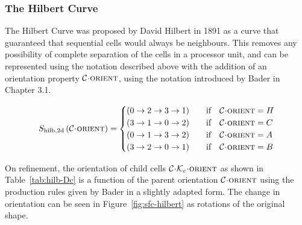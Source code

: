 \documentclass[twoside]{IIBproject}
\newcommand{\acc}{{\mkern 0.5mu\cdot\mkern 0.5mu}}
\numberwithin{figure}{section}
\begin{document}

        \subsubsection{The Hilbert Curve}
            \label{sec:tftt-hilb}

            The Hilbert Curve was proposed by David Hilbert in 1891 as a curve that guaranteed that sequential cells would always be neighbours. This removes any possibility of complete separation of the cells in a processor unit, and can be represented using the notation described above with the addition of an orientation property $\mathcal{C}\acc\textproc{orient}$, using the notation introduced by Bader \cite{bader2013} in Chapter 3.1.

            \begin{equation}
                S_{\mathrm{hilb,2d}}\left(\mathcal{C}\acc\textproc{orient}\right) =
                \begin{cases}
                    \left( 0 \to 2 \to 3 \to 1\right) & \qif \mathcal{C}\acc\textproc{orient}=H \\
                    \left( 3 \to 1 \to 0 \to 2\right) & \qif \mathcal{C}\acc\textproc{orient}=C \\
                    \left( 0 \to 1 \to 3 \to 2\right) & \qif \mathcal{C}\acc\textproc{orient}=A \\
                    \left( 3 \to 2 \to 0 \to 1\right) & \qif \mathcal{C}\acc\textproc{orient}=B
                \end{cases}
            \end{equation}

            On refinement, the orientation of child cells $\mathcal{C}\acc\mathcal{K}_c\acc\textproc{orient}$ as shown in Table~\ref{tab:hilb-Dc} is a function of the parent orientation $\mathcal{C}\acc\textproc{orient}$ using the production rules given by Bader \cite{bader2013} in a slightly adapted form. The change in orientation can be seen in Figure~\ref{fig:sfc-hilbert} as rotations of the original shape. 
\end{document}
